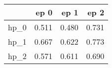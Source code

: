 \begin{tabular}{lrrr}
\toprule
{} &   ep 0 &   ep 1 &   ep 2 \\
\midrule
hp\_0 &  0.511 &  0.480 &  0.731 \\
hp\_1 &  0.667 &  0.622 &  0.773 \\
hp\_2 &  0.571 &  0.611 &  0.690 \\
\bottomrule
\end{tabular}
